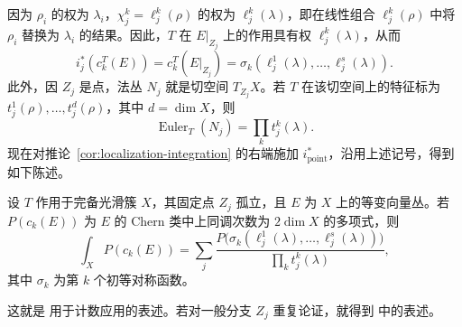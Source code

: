 因为 $\rho_i$ 的权为 $\lambda_i$，$\chi_j^k=\ell_j^k(\rho)$ 的权为 $\ell_j^k(\lambda)$，即在线性组合 $\ell_j^k(\rho)$ 中将 $\rho_i$ 替换为 $\lambda_i$ 的结果。因此，$T$ 在 $E|_{Z_j}$ 上的作用具有权 $\ell_j^k(\lambda)$，从而
\[
i_j^*(c_k^T(E))=c_k^T(E|_{Z_j})=\sigma_k(\ell_j^1(\lambda),\ldots,\ell_j^s(\lambda)).
\]
此外，因 $Z_j$ 是点，法丛 $N_j$ 就是切空间 $T_{Z_j}X$。若 $T$ 在该切空间上的特征标为 $t_j^1(\rho),\ldots,t_j^d(\rho)$，其中 $d=\dim X$，则
\begin{equation}\label{eq:isolated-fixed-tangent-euler}
\operatorname{Euler}_T(N_j)=\prod_kt_j^k(\lambda).
\end{equation}
现在对推论~\ref{cor:localization-integration} 的右端施加 $i_{\mathrm{point}}^*$，沿用上述记号，得到如下陈述。
\begin{proposition}\label{prop:chern-polynomial-localization}
设 $T$ 作用于完备光滑簇 $X$，其固定点 $Z_j$ 孤立，且 $E$ 为 $X$ 上的等变向量丛。若 $P(c_k(E))$ 为 $E$ 的 Chern 类中上同调次数为 $2\dim X$ 的多项式，则
\[
\int_XP(c_k(E))=\sum_j\frac{P\bigl(\sigma_k(\ell_j^1(\lambda),\ldots,\ell_j^s(\lambda))\bigr)}{\prod_kt_j^k(\lambda)},
\]
其中 $\sigma_k$ 为第 $k$ 个初等对称函数。
\end{proposition}
这就是  用于计数应用的表述。若对一般分支 $Z_j$ 重复论证，就得到  中的表述。

